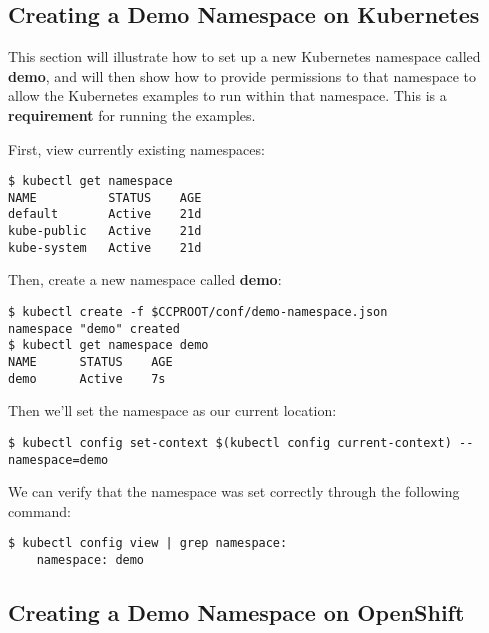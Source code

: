 \documentclass[letterpaper,12pt]{article}
\begin{document}
\subsection{Creating a Demo Namespace on Kubernetes}\label{/_project_setup/_creating_a_demo_namespace_on_kubernetes}

This section will illustrate how to set up a new Kubernetes namespace called \textbf{demo}, and will then show how to provide permissions to that namespace to allow the Kubernetes examples to run within that namespace. This is a \textbf{requirement} for running the examples.

First, view currently existing namespaces:
\vspace{.75em}
\begin{lstlisting}
$ kubectl get namespace
NAME          STATUS    AGE
default       Active    21d
kube-public   Active    21d
kube-system   Active    21d
\end{lstlisting}

Then, create a new namespace called \textbf{demo}:
\vspace{.75em}
\begin{lstlisting}
$ kubectl create -f $CCPROOT/conf/demo-namespace.json
namespace "demo" created
$ kubectl get namespace demo
NAME      STATUS    AGE
demo      Active    7s
\end{lstlisting}

Then we'll set the namespace as our current location:
\vspace{.75em}
\begin{lstlisting}
$ kubectl config set-context $(kubectl config current-context) --namespace=demo
\end{lstlisting}

We can verify that the namespace was set correctly through the following command:
\vspace{.75em}
\begin{lstlisting}
$ kubectl config view | grep namespace:
    namespace: demo
\end{lstlisting}

\subsection{Creating a Demo Namespace on OpenShift}\label{/_project_setup/_creating_a_demo_namespace_on_openshift}
\end{document}
